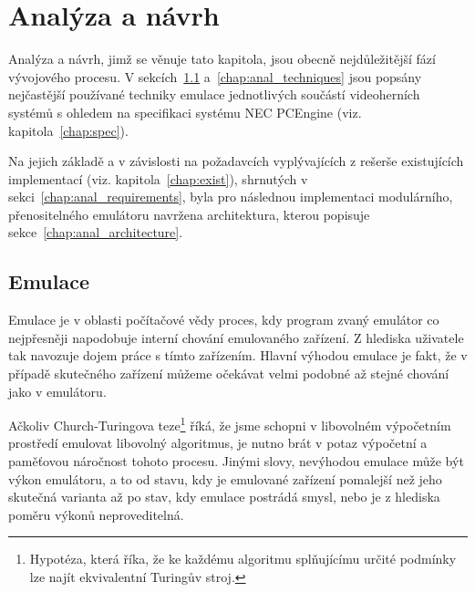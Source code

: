 
\chapter{Analýza a návrh}\label{chap:anal}

Analýza a návrh, jimž se věnuje tato kapitola, jsou obecně nejdůležitější fází
vývojového procesu. V sekcích~\ref{chap:anal_emulation}
a~\ref{chap:anal_techniques} jsou popsány nejčastější používané techniky emulace
jednotlivých součástí videoherních systémů s ohledem na specifikaci systému NEC
PCEngine (viz. kapitola~\ref{chap:spec}).

Na jejich základě a v závislosti na požadavcích vyplývajících z rešerše
existujících implementací (viz. kapitola~\ref{chap:exist}), shrnutých v
sekci~\ref{chap:anal_requirements}, byla pro následnou implementaci
modulárního, přenositelného emulátoru navržena architektura, kterou popisuje
sekce~\ref{chap:anal_architecture}.


\section{Emulace}\label{chap:anal_emulation}

Emulace je v oblasti počítačové vědy proces, kdy program zvaný emulátor co
nejpřesněji napodobuje interní chování emulovaného zařízení. Z hlediska
uživatele tak navozuje dojem práce s tímto zařízením. Hlavní výhodou emulace je
fakt, že v případě skutečného zařízení můžeme očekávat velmi podobné až stejné
chování jako v emulátoru.

Ačkoliv Church-Turingova teze\footnote{Hypotéza, která říka, že ke každému
algoritmu splňujícímu určité podmínky lze najít ekvivalentní Turingův stroj.}
říká, že jsme schopni v libovolném výpočetním prostředí emulovat libovolný
algoritmus, je nutno brát v potaz výpočetní a paměťovou náročnost tohoto
procesu. Jinými slovy, nevýhodou emulace může být výkon emulátoru, a to od
stavu, kdy je emulované zařízení pomalejší než jeho skutečná varianta až po
stav, kdy emulace postrádá smysl, nebo je z hlediska poměru výkonů
neproveditelná.~\cite{Knuth97}

